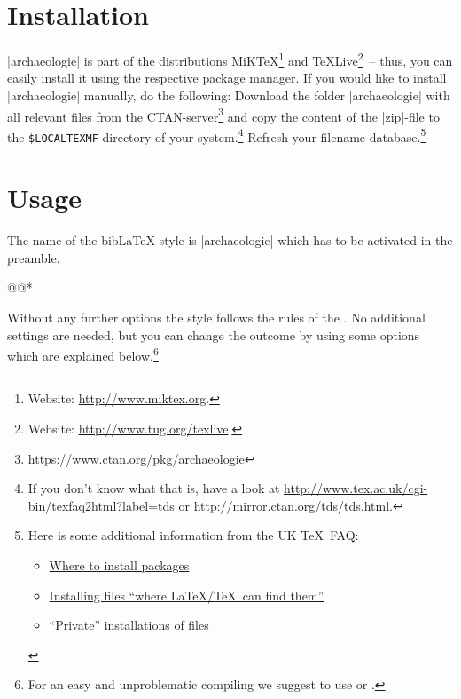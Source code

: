 \documentclass[a4paper,
10pt,
greek,
french,
spanish,
italian,
ngerman,
english,
]{ltxdoc}
\begin{document}
\section{Installation}
|archaeologie| is part of the distributions MiK\TeX \footnote{Website: \url{http://www.miktex.org}.} 
and \TeX Live\footnote{Website: \url{http://www.tug.org/texlive}.}~-- thus, you
can easily install it using the respective package manager. 
If you would like to
install |archaeologie| manually, do the following:
Download the folder |archaeologie| with all relevant files from the CTAN-server\footnote{\url{https://www.ctan.org/pkg/archaeologie}} and copy the content of the |zip|-file to the \texttt{\$LOCALTEXMF} directory of
 your system.\footnote{If you don't know what that is, have a look at
\url{http://www.tex.ac.uk/cgi-bin/texfaq2html?label=tds} or 
\url{http://mirror.ctan.org/tds/tds.html}.} 
Refresh your filename database.\footnote{ 
Here is some additional information from the UK \TeX\ FAQ:
\begin{itemize}[nosep,after=\vspace{-\baselineskip} ]
  \item \href{%
    http://www.tex.ac.uk/cgi-bin/texfaq2html?label=install-where}{%
    Where to install packages}
  \item \href{%
    http://www.tex.ac.uk/cgi-bin/texfaq2html?label=inst-wlcf}{%
    Installing files \enquote{where \LaTeX /TeX\ can find them}}
  \item \href{%
    http://www.tex.ac.uk/cgi-bin/texfaq2html?label=privinst}{%
    \enquote{Private} installations of files}
\end{itemize}
}

\section{Usage}
   The name of the bib\LaTeX-style is  |archaeologie| which has to be activated in the preamble. 

\begin{code}
\usepackage[style=archaeologie,%
          *@@*]{biblatex}
@@*
\end{code}

Without any further options the style follows the rules of the \DAI. 
No additional settings are needed,
but you can change the outcome by using some options which are explained below.\footnote{For an easy and unproblematic compiling we suggest to use  or  .}
\end{document}
